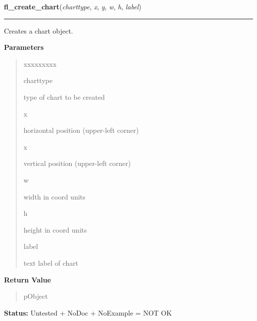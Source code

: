\hspace{.8\funcindent}\begin{boxedminipage}{\funcwidth}

    \raggedright \textbf{fl\_create\_chart}(\textit{charttype}, \textit{x}, \textit{y}, \textit{w}, \textit{h}, \textit{label})

    \vspace{-1.5ex}

    \rule{\textwidth}{0.5\fboxrule}
\setlength{\parskip}{2ex}
    Creates a chart object.

\setlength{\parskip}{1ex}
      \textbf{Parameters}
      \vspace{-1ex}

      \begin{quote}
        \begin{Ventry}{xxxxxxxxx}

          \item[charttype]

          type of chart to be created

          \item[x]

          horizontal position (upper-left corner)

          \item[x]

          vertical position (upper-left corner)

          \item[w]

          width in coord units

          \item[h]

          height in coord units

          \item[label]

          text label of chart

        \end{Ventry}

      \end{quote}

      \textbf{Return Value}
    \vspace{-1ex}

      \begin{quote}
      pObject

      \end{quote}

\textbf{Status:} Untested + NoDoc + NoExample = NOT OK



    \end{boxedminipage}

